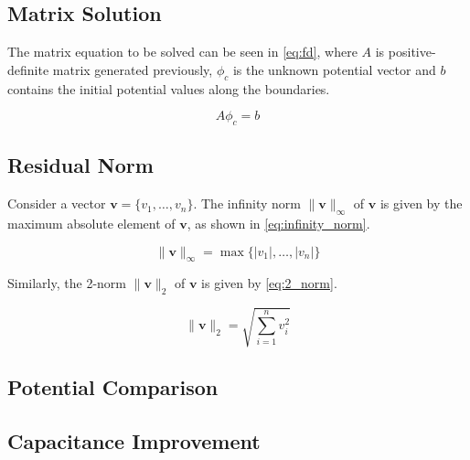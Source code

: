 \documentclass[a4paper,titlepage]{article}
\begin{document}
	\subsection{Matrix Solution}
	
	The matrix equation to be solved can be seen in \cref{eq:fd}, where $A$ is positive-definite matrix generated previously, $\phi_c$ is the unknown potential vector and $b$ contains the initial potential values along the boundaries.
	
	\begin{equation} \label{eq:fd}
		A\phi_c = b
	\end{equation}
	
	\subsection{Residual Norm}
	
	Consider a vector $\textbf{v} = \{v_1, \ldots, v_n\}$. The infinity norm $\|\textbf{v}\|_\infty$ of $\textbf{v}$ is given by the maximum absolute element of $\textbf{v}$, as shown in \cref{eq:infinity_norm}.
	
	\begin{equation} \label{eq:infinity_norm}
		\|\textbf{v}\|_\infty = \max\{|v_1|, \ldots, |v_n|\}
	\end{equation}
	
	Similarly, the 2-norm $\|\textbf{v}\|_2$ of $\textbf{v}$ is given by \cref{eq:2_norm}.
	
	\begin{equation} \label{eq:2_norm}
		\|\textbf{v}\|_2 = \sqrt{\sum_{i = 1}^{n} v_i^2}
	\end{equation}
	
	\subsection{Potential Comparison}
	
	\subsection{Capacitance Improvement}
	
%
	
\end{document}
